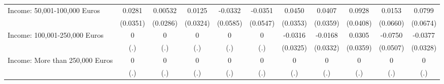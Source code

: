 {\begin{tabular}{l*{10}{c}}
Income: 50,001-100,000 Euros&      0.0281         &     0.00532         &      0.0125         &     -0.0332         &     -0.0351         &      0.0450         &      0.0407         &      0.0928\sym{*}  &      0.0153         &      0.0799         \\
            &    (0.0351)         &    (0.0286)         &    (0.0324)         &    (0.0585)         &    (0.0547)         &    (0.0353)         &    (0.0359)         &    (0.0408)         &    (0.0660)         &    (0.0674)         \\
\addlinespace
Income: 100,001-250,000 Euros&           0         &           0         &           0         &           0         &           0         &     -0.0316         &     -0.0168         &      0.0305         &     -0.0750         &     -0.0377         \\
            &         (.)         &         (.)         &         (.)         &         (.)         &         (.)         &    (0.0325)         &    (0.0332)         &    (0.0359)         &    (0.0507)         &    (0.0328)         \\
\addlinespace
Income: More than 250,000 Euros&           0         &           0         &           0         &           0         &           0         &           0         &           0         &           0         &           0         &           0         \\
            &         (.)         &         (.)         &         (.)         &         (.)         &         (.)         &         (.)         &         (.)         &         (.)         &         (.)         &         (.)         \\
\bottomrule
\end{tabular}
}
